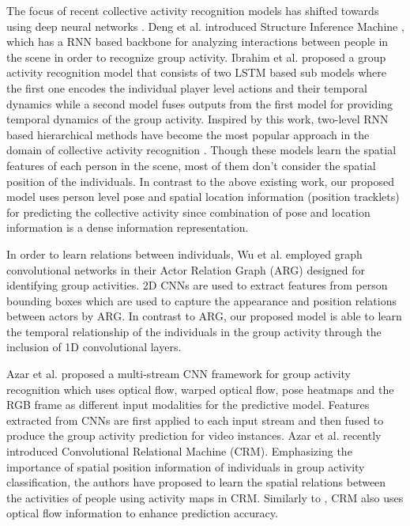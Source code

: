 \documentclass[a4paper,fleqn]{cas-dc}
\begin{document}
The focus of recent collective activity recognition models has shifted towards using deep neural networks \cite{Wu2017_hac_review}. 
Deng et al. \cite{Deng_2016_structureInference} introduced Structure Inference Machine , which has a RNN based backbone for analyzing interactions between people in the scene in order to recognize group activity. 
Ibrahim et al. \cite{Ibrahim2016_hierarchical_deep} proposed a group activity recognition model that consists of two LSTM based sub models where the first one encodes the individual player level actions and their temporal dynamics while a second model fuses outputs from the first model for providing temporal dynamics of the group activity. 
Inspired by this work, two-level RNN based hierarchical methods have become the most popular approach in the domain of collective activity recognition \cite{Ibrahim2016_hierarchical_deep,Ramanathan2016_keyperson,Tsunoda2017_footballAction,Qi2019_stagNet}. 
Though these models learn the spatial features of each person in the scene, most of them don't consider the spatial position of the individuals. 
In contrast to the above existing work, our proposed model uses person level pose and spatial location information (position tracklets) for predicting the collective activity since combination of pose and location information is a dense information representation.

In order to learn relations between individuals, Wu et al.\cite{Wu2019_ARG} employed graph convolutional networks in their Actor Relation Graph (ARG) designed for identifying group activities. 
2D CNNs are used to extract features from person bounding boxes which are used to capture the appearance and position relations between actors by ARG. 
In contrast to ARG, our proposed model is able to learn the temporal relationship of the individuals in the group activity through the inclusion of 1D convolutional layers.

Azar et al. \cite{Azar2018_multistream} proposed a multi-stream CNN framework  for group activity recognition which uses optical flow, warped optical flow, pose heatmaps and the RGB frame as different input modalities for the predictive model. 
Features extracted from CNNs are first applied to each input stream and then fused to produce the group activity prediction for video instances. 
Azar et al. \cite{Azar2019_convoRelational} recently introduced Convolutional Relational Machine (CRM). 
Emphasizing the importance of spatial position information of individuals in group activity classification, the authors have proposed to learn the spatial relations between the activities of people using activity maps in CRM. 
Similarly to \cite{Azar2018_multistream}, CRM also uses optical flow information to enhance prediction accuracy.
\end{document}
